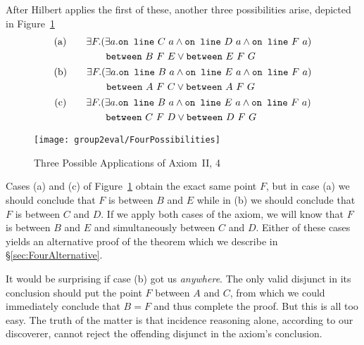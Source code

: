 After Hilbert applies the first of these, another three possibilities arise, depicted in Figure~\ref{fig:FourPossibilities}
\begin{gather*}
\begin{split}\text{(a)}\qquad
&\exists F. (\exists a. \code{on\ line}\ C\ a \wedge \code{on\ line}\ D\ a \wedge \code{on\ line}\ F\ a)\\
&\qquad \between{B}{F}{E} \vee \between{E}{F}{G} 
\end{split}\\
\begin{split}\text{(b)}\qquad
&\exists F. (\exists a. \code{on\ line}\ B\ a \wedge \code{on\ line}\ E\ a \wedge \code{on\ line}\ F\ a)\\
&\qquad \between{A}{F}{C} \vee \between{A}{F}{G} 
\end{split}\\
\begin{split}\text{(c)}\qquad
&\exists F. (\exists a. \code{on\ line}\ B\ a \wedge \code{on\ line}\ E\ a \wedge \code{on\ line}\ F\ a)\\
&\qquad \between{C}{F}{D} \vee \between{D}{F}{G} 
\end{split}\\
\end{gather*}

\begin{figure}
  \texttt{[image: group2eval/FourPossibilities]}
  \caption{Three Possible Applications of Axiom~II, 4}
  \label{fig:FourPossibilities}
\end{figure}

Cases (a) and (c) of Figure~\ref{fig:FourPossibilities} obtain the exact same point $F$, but in case (a) we should conclude that $F$ is between $B$ and $E$ while in (b) we should conclude that $F$ is between $C$ and $D$. If we apply both cases of the axiom, we will know that $F$ is between $B$ and $E$ and simultaneously between $C$ and $D$. Either of these cases yields an alternative proof of the theorem which we describe in \S\ref{sec:FourAlternative}.

It would be surprising if case (b) got us \emph{anywhere}. The only valid disjunct in its conclusion should put the point $F$ between $A$ and $C$, from which we could immediately conclude that $B = F$ and thus complete the proof. But this is all too easy. The truth of the matter is that incidence reasoning alone, according to our discoverer, cannot reject the offending disjunct in the axiom's conclusion.

